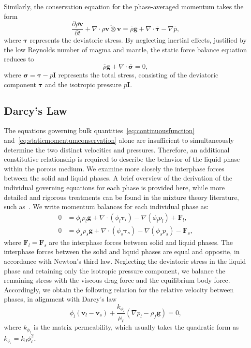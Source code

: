 Similarly, the conservation equation for the phase-averaged momentum takes 
the form 
\begin{equation}\label{eq:momentumconservation}
\frac{\partial \overline{\rho \mathbf{v}}}{\partial t} + \nabla \cdot \overline{\rho \mathbf{v} \otimes \mathbf{v}}  = 
\overline{\rho}\mathbf{g} + \nabla \cdot \overline{\pmb{\tau}} - \nabla \overline{p},
\end{equation}
where $\pmb{\tau}$ represents the deviatoric stress.
By neglecting inertial effects, justified by the low Reynolds number of magma 
and mantle, the static force balance equation reduces to
\begin{equation}\label{eq:staticmomentumconservation}
\overline{\rho}\mathbf{g} + \nabla \cdot \overline{\pmb{\sigma}}= 0,
\end{equation}
where $\pmb{\sigma} = \pmb{\tau} - p\pmb{I}$ represents the total stress, 
consisting of the deviatoric component $\pmb{\tau}$ and the isotropic 
pressure $p\pmb{I}$.

\subsection{Darcy's Law}
The equations governing bulk quantities~\eqref{eq:continuousfunction} 
and~\eqref{eq:staticmomentumconservation} alone are insufficient to simultaneously
determine the two distinct velocities and pressures. Therefore, an additional 
constitutive relationship is required to describe the behavior of the liquid 
phase within the porous medium.
We examine more closely the interphase forces between the solid and liquid 
phases. A brief overview of the derivation of the individual governing equations 
for each phase is provided here, while more detailed and rigorous treatments can 
be found in the mixture theory literature, such as~\citet{mixturetheory}.
We write momentum balances for each individual phase as:
\begin{equation}\label{eq:phasemomentum}
\begin{aligned}
		  0 &= \phi_l \rho_l \mathbf{g} + \nabla \cdot (\phi_l \pmb{\tau}_l) - \nabla (\phi_l p_l) + \mathbf{F}_l,\\
		  0 &=  \phi_s \rho_s \mathbf{g} + \nabla \cdot (\phi_s \pmb{\tau}_s) - \nabla (\phi_s p_s) - \mathbf{F}_s,
\end{aligned}
\end{equation}
where $\mathbf{F}_l = \mathbf{F}_s$ are the interphase forces between solid and 
liquid phases. 
The interphase forces between the solid and liquid phases are equal and 
opposite, in accordance with Newton’s third law.
Neglecting the deviatoric stress in the liquid phase and retaining only the 
isotropic pressure component, we balance the remaining stress with the viscous 
drag force and the equilibrium body force.
Accordingly, we obtain the following relation for the relative velocity between 
phases, in alignment with Darcy’s law
\begin{equation}\label{eq:darcylaw}
		  \phi_l (\mathbf{v}_l - \mathbf{v}_s)
		  + \frac{k_{\phi_l}}{\mu_l}(\nabla p_l - \rho_f\mathbf{g})
	    = 0,
\end{equation}
where $k_{\phi_l}$ is the matrix permeability, which usually takes the quadratic 
form as $k_{\phi_l} = k_0 \phi_l^2$.

